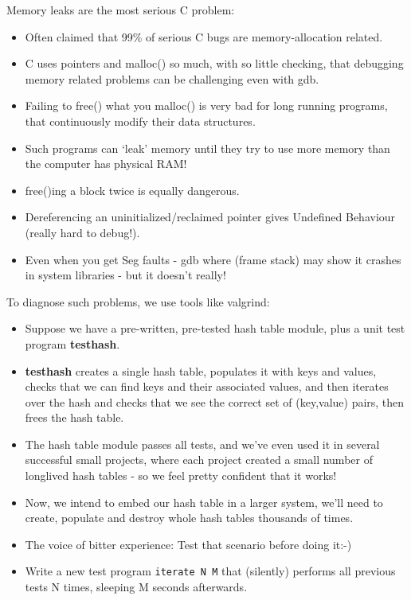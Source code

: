 \documentclass[handout]{beamer}
\newcommand{\pitem}{\pause \item}
\begin{document}
\begin{frame}[fragile]
    Memory leaks are the most serious C problem:
    \begin{itemize}
      \item
      Often claimed that
      \alert{99\% of serious C bugs are memory-allocation related}.
      \item
      C uses \alert{pointers and malloc()} so much, with
      so little checking, that debugging memory related
      problems can be challenging even with gdb.
    \pause
      \item
      Failing to \alert{free() what you malloc()} is
      very bad for long running programs, that
      continuously \alert{modify their data structures}.
    \pause
      \item
      Such programs can `leak' memory until they try to use more memory than
      the computer has physical RAM!
    \pause
      \item
      \alert{free()ing a block twice} is equally dangerous.
    \pause
      \item
      \alert{Dereferencing} an uninitialized/reclaimed pointer
      gives \alert{Undefined Behaviour} (really hard to debug!).
    \pause
      \item
      Even when you get \alert{Seg faults} - \alert{gdb where} (frame stack)
      may show it crashes in system libraries - but it doesn't really!
    \end{itemize}
    To diagnose such problems, we use tools like \alert{valgrind}:
\end{frame}

\begin{frame}[fragile]
    \begin{itemize}
    \item
      Suppose we have a \alert{pre-written, pre-tested}
      hash table module, plus a unit test program {\bf testhash}.
    \pitem
      {\bf testhash} creates a single hash table, populates it with keys and values,
      checks that we can find keys and their associated values, and
      then iterates over the hash and checks that we see the correct
      set of (key,value) pairs, then frees the hash table.
    \pitem
      The hash table module \alert{passes all tests}, and
      we've even used it in several successful small projects,
      where each project created a small number of \alert{longlived} hash tables
      - so we feel pretty confident that it works!
    \pitem
      Now, we intend to embed our hash table in a larger system,
      we'll need to create, populate and destroy whole hash tables
      \alert{thousands of times}.
    \pitem
      The voice of bitter experience: \alert{Test that scenario} before doing it:-)
    \pause
    \item
      Write a new test program \verb+iterate N M+ that (silently)
      performs all previous tests N times, sleeping M seconds afterwards.
    \end{itemize}
\end{frame}
\end{document}
